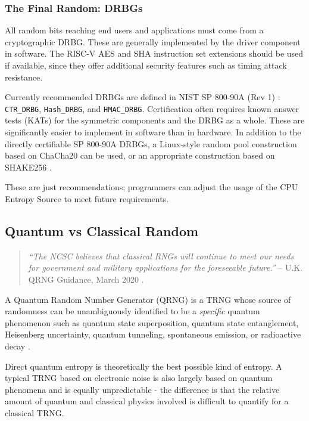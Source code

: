 \subsubsection{The Final Random: DRBGs}
\label{sec:drbgs}

    All random bits reaching end users and applications must come from a
    cryptographic DRBG. These are generally implemented by the driver
    component in software. The RISC-V AES and SHA instruction set extensions
    should be used if available, since they offer additional
    security features such as timing attack resistance.

    Currently recommended DRBGs are defined in NIST SP 800-90A (Rev 1)
    \cite{BaKe15}: \verb|CTR_DRBG|, \verb|Hash_DRBG|, and \verb|HMAC_DRBG|.
    Certification often requires known answer tests (KATs) for the symmetric
    components and the DRBG as a whole. These are significantly easier to
    implement in software than in hardware. In addition to the directly
    certifiable SP 800-90A DRBGs, a Linux-style random pool construction
    based on ChaCha20 \cite{Mu20} can be used, or an appropriate construction
    based on SHAKE256 \cite{NI15}.

    These are just recommendations; programmers can adjust the usage of the
    CPU Entropy Source to meet future requirements.


\subsection{Quantum vs Classical Random}
\label{sec:quantum}

    \begin{quote}
        {\it ``The NCSC believes that classical RNGs will continue to
        meet our needs for government and military applications for the
        foreseeable future.''}
        \flushright -- U.K. QRNG Guidance, March 2020 \cite{NC20}.
    \end{quote}

    A Quantum Random Number Generator (QRNG) is a TRNG whose source of
    randomness can be unambiguously identified to be a \emph{specific}
    quantum phenomenon such as quantum state superposition, quantum state
    entanglement, Heisenberg uncertainty, quantum tunneling, spontaneous
    emission, or radioactive decay \cite{IT19}.

    Direct quantum entropy is theoretically the best possible kind of
    entropy. A typical TRNG based on electronic noise is also largely
    based on quantum phenomena and is equally unpredictable - the difference
    is that the relative amount of quantum and classical physics involved is
    difficult to quantify for a classical TRNG.

